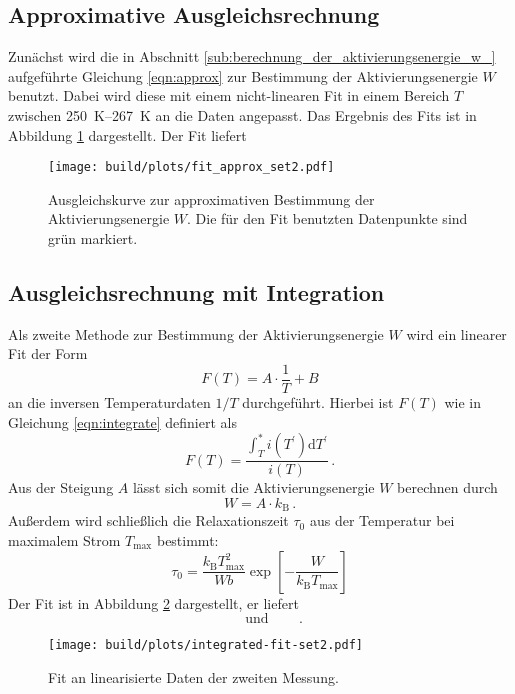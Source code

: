 \subsection{Approximative Ausgleichsrechnung}
\label{subsec:approx}
Zunächst wird die in Abschnitt \ref{sub:berechnung_der_aktivierungsenergie_w_}
aufgeführte Gleichung \ref{eqn:approx} zur Bestimmung der Aktivierungsenergie
$W$ benutzt. Dabei wird diese mit einem nicht-linearen Fit in einem Bereich
$T$ zwischen \SIrange{250}{267}{\kelvin} an die Daten angepasst.
Das Ergebnis des Fits ist in Abbildung \ref{fig:fit_approx_set2} dargestellt.
Der Fit liefert
\begin{equation*}
    
\end{equation*}
\begin{figure}
    \centering
    \texttt{[image: build/plots/fit\_approx\_set2.pdf]}
    \caption{Ausgleichskurve zur approximativen Bestimmung der
    Aktivierungsenergie $W$. Die für den Fit benutzten Datenpunkte
    sind grün markiert.}
    \label{fig:fit_approx_set2}
\end{figure}

\subsection{Ausgleichsrechnung mit Integration}
\label{subsec:integration}
Als zweite Methode zur Bestimmung der Aktivierungsenergie $W$ wird ein
linearer Fit der Form
\begin{equation*}
    F(T) = A\cdot\frac{1}{T} + B
\end{equation*}
an die inversen Temperaturdaten $1/T$ durchgeführt.
Hierbei ist $F(T)$ wie in Gleichung \ref{eqn:integrate} definiert als
\begin{equation*}
    F(T) = \frac{\int_T^\ast i(T^\prime)\mathrm{d}T^\prime}{i(T)}\,.
\end{equation*}
Aus der Steigung $A$ lässt sich somit die Aktivierungsenergie $W$
berechnen durch
\begin{equation*}
    W = A\cdot k_\text{B}\,.
\end{equation*}
Außerdem wird schließlich die Relaxationszeit $\tau_0$ aus der Temperatur
bei maximalem Strom $T_\text{max}$ bestimmt:
\begin{equation*}
    \tau_0 = \frac{k_\text{B}T_\text{max}^2}{Wb}
             \exp\!\left[-\frac{W}{k_\text{B}T_\text{max}} \right]
\end{equation*}
Der Fit ist in Abbildung \ref{fig:integrate_fit} dargestellt, er liefert
\begin{equation*}
     \qquad\text{und}\qquad \,.
\end{equation*}
\begin{figure}
    \centering
    \texttt{[image: build/plots/integrated-fit-set2.pdf]}
    \caption{Fit an linearisierte Daten der zweiten Messung.}
    \label{fig:integrate_fit}
\end{figure}

